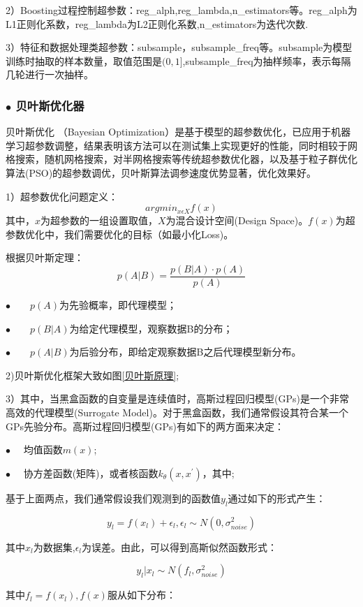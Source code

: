 \documentclass[withoutpreface,bwprint]{cumcmthesis}
\begin{document}
    2）Boosting过程控制超参数：reg\_alph,reg\_lambda,n\_estimators等。reg\_alph为L1正则化系数，reg\_lambda为L2正则化系数,n\_estimators为迭代次数.
   
    3）特征和数据处理类超参数：subsample，subsample\_freq等。subsample为模型训练时抽取的样本数量，取值范围是$(0,1]$,subsample\_freq为抽样频率，表示每隔几轮进行一次抽样。
    \subsubsection*{$\bullet$ 贝叶斯优化器}

    贝叶斯优化 （Bayesian Optimization）是基于模型的超参数优化，已应用于机器学习超参数调整，结果表明该方法可以在测试集上实现更好的性能，同时相较于网格搜索，随机网格搜索，对半网格搜索等传统超参数优化器，以及基于粒子群优化算法(PSO)的超参数调优，贝叶斯算法调参速度优势显著，优化效果好。
    
    1）超参数优化问题定义：
$$argmin_{x\epsilon X} f(x)$$
    其中，$x$为超参数的一组设置取值，$X$为混合设计空间(Design Space)。$f(x)$为超参数优化中，我们需要优化的目标（如最小化Loss)。

    根据贝叶斯定理：
    $$p(A|B)=\frac{p(B|A) \cdot p(A)}{p(A)}$$
    
    $\bullet \qquad p(A)$为先验概率，即代理模型；
    
    $\bullet \qquad p(B|A)$为给定代理模型，观察数据B的分布；
    
    $\bullet \qquad p(A|B)$为后验分布，即给定观察数据B之后代理模型新分布。
    
    2)贝叶斯优化框架大致如图\ref{贝叶斯原理};

    3）其中，当黑盒函数的自变量是连续值时，高斯过程回归模型(GPs)是一个非常高效的代理模型(Surrogate Model)。对于黑盒函数，我们通常假设其符合某一个GPs先验分布。高斯过程回归模型(GPs)有如下的两方面来决定：
    
    $\bullet \quad$ 均值函数$m(x)$;

    $\bullet \quad$ 协方差函数(矩阵)，或者核函数$k_\theta(x,x^')$，其中;

    基于上面两点，我们通常假设我们观测到的函数值$y_l$通过如下的形式产生：

    $$y_l=f(x_l)+\epsilon_l ,\epsilon_l \sim N  (0,\sigma_{noise}^2)$$

    其中$x_l$为数据集,$\epsilon_l$为误差。由此，可以得到高斯似然函数形式：

    $$y_l|x_l \sim N(f_l,\sigma_{noise}^2) $$

    其中$f_l=f(x_l),f(x)$服从如下分布：
    
\end{document}
